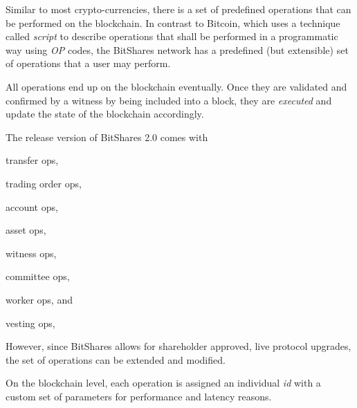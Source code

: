 Similar to most crypto-currencies, there is a set of predefined operations that
can be performed on the blockchain. In contrast to Bitcoin, which uses a
technique called \emph{script} to describe operations that shall be performed
in a programmatic way using \emph{OP} codes, the BitShares network has a
predefined (but extensible) set of operations that a user may perform.

All operations end up on the blockchain eventually. Once they are validated and
confirmed by a witness by being included into a block, they are \emph{executed}
and update the state of the blockchain accordingly.

The release version of BitShares 2.0 comes with 
\begin{inparaenum}[(a)]
 \item transfer ops,
 \item trading order ops,
 \item account ops,
 \item asset ops,
 \item witness ops,
 \item committee ops,
 \item worker ops, and
 \item vesting ops,
\end{inparaenum}
However, since BitShares allows for shareholder approved, live protocol
upgrades, the set of operations can be extended and modified. 

On the blockchain level, each operation is assigned an individual \emph{id}
with a custom set of parameters for performance and latency reasons.

